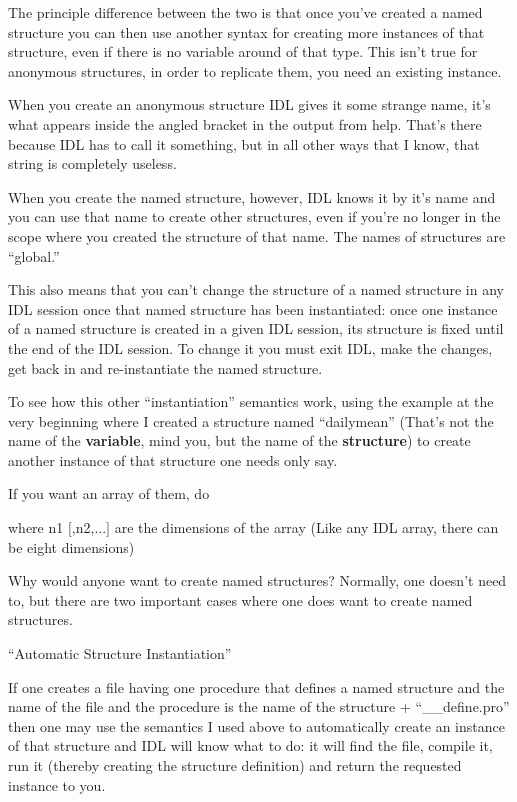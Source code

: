 The principle difference between the two is that once you've created a
named structure you can then use another syntax for creating more
instances of that structure, even if there is no variable around of
that type. This isn't true for anonymous structures, in order to
replicate them, you need an existing instance. 

When you create an anonymous structure IDL gives it some strange name,
it's what appears inside the angled bracket in the output from help.
That's there because IDL has to call it something, but in all other
ways that I know, that string is completely useless.  

When you create the named structure, however, IDL knows it by it's
name and you can use that name to create other structures, even if
you're no longer in the scope where you created the structure of that
name.  The names of structures are ``global.''

This also means that you can't change the structure of a named
structure in any IDL session once that named structure has been
instantiated: once one instance of a named structure is created in a
given IDL session, its structure is fixed until the end of the IDL
session. To change it you must exit IDL, make the changes, get back in
and re-instantiate the named structure.

To see how this other ``instantiation'' semantics work, using the
example at the very beginning where I created a structure named
``dailymean'' (That's not the name of the \textbf{variable}, mind you,
but the name of the \textbf{structure}) to create another instance of
that structure one needs only say.


If you want an array of them, do

  
where n1 $[$,n2,...$]$ are the dimensions of the array (Like any IDL
array, there can be eight dimensions)

Why would anyone want to create named structures? Normally, one
doesn't need to, but there are two important cases where one does want
to create named structures.

\bi
  \item ``Automatic Structure Instantiation''
    
    If one creates a file having one procedure that defines a named
    structure and the name of the file and the procedure is the name
    of the structure + ``\_\_define.pro'' then one may use the
    semantics I used above to automatically create an instance of that
    structure and IDL will know what to do: it will find the file,
    compile it, run it (thereby creating the structure definition) and
    return the requested instance to you.

